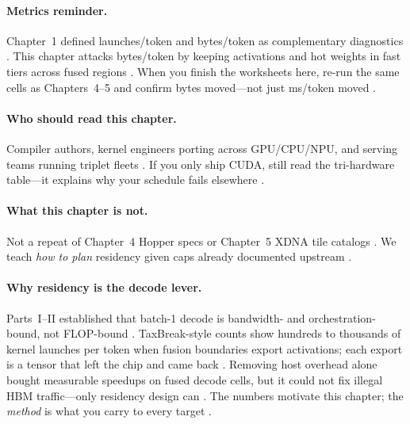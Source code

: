 \paragraph{Metrics reminder.}
Chapter~1 defined launches/token and bytes/token as complementary diagnostics \citep{taxbreak2026,memoryfloor2026}.
This chapter attacks bytes/token by keeping activations and hot weights in fast tiers across fused regions \citep{dao2022flashattention,patel2025llminference}.
When you finish the worksheets here, re-run the same cells as Chapters~4--5 and confirm bytes moved---not just ms/token moved \citep{yirage2026,nvidia2022hopper,amd2024aie}.

\paragraph{Who should read this chapter.}
Compiler authors, kernel engineers porting across GPU/CPU/NPU, and serving teams running triplet fleets \citep{yirage2026,patel2025llminference,amd2024xdna,nvidia2022hopper}.
If you only ship CUDA, still read the tri-hardware table---it explains why your schedule fails elsewhere \citep{chen2020compilerbasedhardw}.

\paragraph{What this chapter is not.}
Not a repeat of Chapter~4 Hopper specs or Chapter~5 XDNA tile catalogs \citep{nvidia2022hopper,amd2024xdna}.
We teach \emph{how to plan} residency given caps already documented upstream \citep{yirage2026,dlbook}.

\paragraph{Why residency is the decode lever.}
Parts~I--II established that batch-1 decode is bandwidth- and orchestration-bound, not FLOP-bound \citep{patel2025llminference,memoryfloor2026}.
TaxBreak-style counts show hundreds to thousands of kernel launches per token when fusion boundaries export activations; each export is a tensor that left the chip and came back \citep{taxbreak2026}.
Removing host overhead alone bought measurable speedups on fused decode cells, but it could not fix illegal HBM traffic---only residency design can \citep{memoryfloor2026,nvidia2024cudagraphs}.
The numbers motivate this chapter; the \emph{method} is what you carry to every target \citep{yirage2026,dao2022flashattention}.

